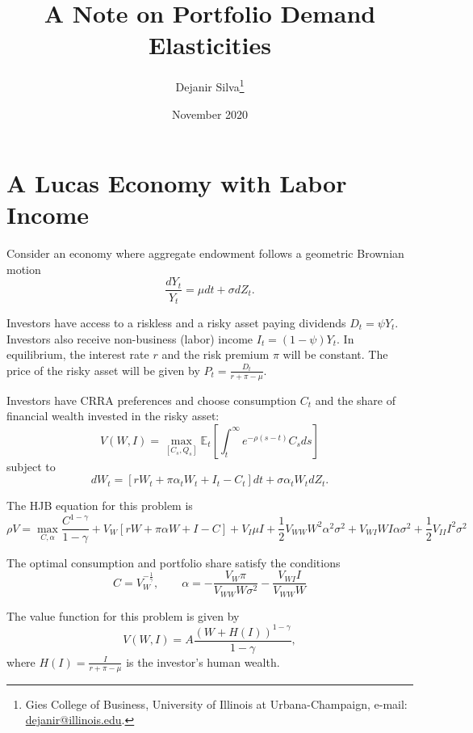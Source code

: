 \documentclass[11pt,english]{article}
\title{\textbf{A Note on Portfolio Demand Elasticities}}
\author{ Dejanir Silva\thanks{Gies College of Business, University of Illinois at Urbana-Champaign, e-mail: \href{dejanir@illinois.edu}{dejanir@illinois.edu}.}}
\date{November 2020}
\begin{document}
	\maketitle
	
\section{A Lucas Economy with Labor Income}

Consider an economy where aggregate endowment follows a geometric Brownian motion
\begin{equation*}
    \frac{d Y_t}{Y_t} = \mu dt + \sigma d Z_t.
\end{equation*}

Investors have access to a riskless and a risky asset paying dividends $D_t = \psi Y_t$. Investors also receive non-business (labor) income $I_t = (1-\psi) Y_t$. In equilibrium, the interest rate $r$ and the risk premium $\pi$ will be constant. The price of the risky asset will be given by $P_t = \frac{D_t}{r+\pi -\mu}$. 

Investors have CRRA preferences and choose consumption $C_t$ and the share of financial wealth invested in the risky asset:
\begin{equation*}
    V(W, I) = \max_{[C_s, Q_s]} \mathbb{E}_t\left[ \int_t^\infty e^{-\rho (s- t)} C_{s} ds \right]
\end{equation*}
subject to
\begin{equation*}
    d W_t = \left[ r W_t + \pi \alpha_t W_t + I_t - C_t  \right] dt + \sigma \alpha_t W_t d Z_t.
\end{equation*}

The HJB equation for this problem is
\begin{equation*}
    \rho V = \max_{C, \alpha} \frac{C^{1-\gamma}}{1-\gamma} + V_W\left[ r W + \pi \alpha W + I  - C\right] + V_I \mu I+ \frac{1}{2} V_{WW} W^2 \alpha^2 \sigma^2 + V_{WI} W  I \alpha \sigma^2 + \frac{1}{2} V_{II} I^2 \sigma^2
\end{equation*}

The optimal consumption and portfolio share satisfy the conditions
\begin{equation*}
 C = V_W^{-\frac{1}{\gamma}}, \qquad     \alpha = -\frac{V_{W} \pi}{V_{WW} W \sigma^2}   - \frac{V_{WI}I}{V_{WW} W}
\end{equation*}

The value function for this problem is given by
\begin{equation*}
    V(W,I) = A \frac{\left( W + H(I) \right)^{1-\gamma}}{1-\gamma},
\end{equation*}
where $H(I) = \frac{I}{r+ \pi - \mu}$ is the investor's human wealth.
\end{document}
